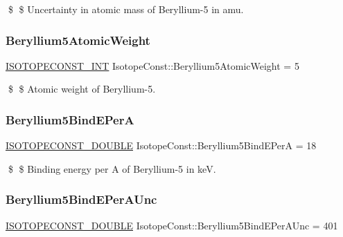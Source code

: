 \$ \$ Uncertainty in atomic mass of Beryllium-\/5 in amu. \mbox{\label{group___isotope_const-_beryllium-_be5_ga7bb914d70f2d4cbec5f8c80e954dd186}} 
\subsubsection{\texorpdfstring{Beryllium5\+Atomic\+Weight}{Beryllium5AtomicWeight}}
{\footnotesize\ttfamily \mbox{\hyperlink{group___isotope_const-_macros_ga5f18360b3e99483a35c32d789e62621c}{I\+S\+O\+T\+O\+P\+E\+C\+O\+N\+S\+T\+\_\+\+I\+NT}} Isotope\+Const\+::\+Beryllium5\+Atomic\+Weight = 5}

\$ \$ Atomic weight of Beryllium-\/5. \mbox{\label{group___isotope_const-_beryllium-_be5_ga8de9a707bd05af18e31311193919b0e4}} 
\subsubsection{\texorpdfstring{Beryllium5\+Bind\+E\+PerA}{Beryllium5BindEPerA}}
{\footnotesize\ttfamily \mbox{\hyperlink{group___isotope_const-_macros_ga8f45a7272ce02c0b4c65c44636ed719a}{I\+S\+O\+T\+O\+P\+E\+C\+O\+N\+S\+T\+\_\+\+D\+O\+U\+B\+LE}} Isotope\+Const\+::\+Beryllium5\+Bind\+E\+PerA = 18}

\$ \$ Binding energy per A of Beryllium-\/5 in keV. \mbox{\label{group___isotope_const-_beryllium-_be5_gaea3a02c0c859f298d85bd34cbfe6ce53}} 
\subsubsection{\texorpdfstring{Beryllium5\+Bind\+E\+Per\+A\+Unc}{Beryllium5BindEPerAUnc}}
{\footnotesize\ttfamily \mbox{\hyperlink{group___isotope_const-_macros_ga8f45a7272ce02c0b4c65c44636ed719a}{I\+S\+O\+T\+O\+P\+E\+C\+O\+N\+S\+T\+\_\+\+D\+O\+U\+B\+LE}} Isotope\+Const\+::\+Beryllium5\+Bind\+E\+Per\+A\+Unc = 401}

